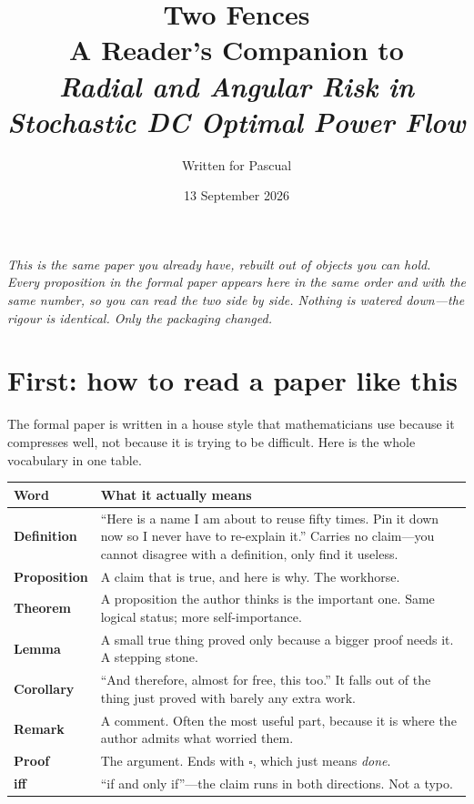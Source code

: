 \documentclass[11pt,a4paper]{article}
\title{\bfseries Two Fences\\[0.3em]
\large A Reader's Companion to\\
\emph{Radial and Angular Risk in Stochastic DC Optimal Power Flow}}
\author{Written for Pascual}
\date{13 September 2026}
\begin{document}
\maketitle

\begin{center}
\begin{minipage}{0.86\textwidth}
\small\itshape
This is the same paper you already have, rebuilt out of objects you can hold.
Every proposition in the formal paper appears here in the same order and with
the same number, so you can read the two side by side. Nothing is watered
down---the rigour is identical. Only the packaging changed.
\end{minipage}
\end{center}

\vspace{1em}
\tableofcontents
\newpage

\section{First: how to read a paper like this}

The formal paper is written in a house style that mathematicians use because it
compresses well, not because it is trying to be difficult. Here is the whole
vocabulary in one table.

\begin{center}
\small
\begin{tabular}{@{}p{}p{}@{}}
\toprule
\textbf{Word} & \textbf{What it actually means} \\
\midrule
\textbf{Definition} & ``Here is a name I am about to reuse fifty times. Pin it down now so I never have to re-explain it.'' Carries no claim---you cannot disagree with a definition, only find it useless. \\[0.4em]
\textbf{Proposition} & A claim that is true, and here is why. The workhorse. \\[0.4em]
\textbf{Theorem} & A proposition the author thinks is the important one. Same logical status; more self-importance. \\[0.4em]
\textbf{Lemma} & A small true thing proved only because a bigger proof needs it. A stepping stone. \\[0.4em]
\textbf{Corollary} & ``And therefore, almost for free, this too.'' It falls out of the thing just proved with barely any extra work. \\[0.4em]
\textbf{Remark} & A comment. Often the most useful part, because it is where the author admits what worried them. \\[0.4em]
\textbf{Proof} & The argument. Ends with $\square$, which just means \emph{done}. \\[0.4em]
\textbf{iff} & ``if and only if''---the claim runs in both directions. Not a typo. \\
\bottomrule
\end{tabular}
\end{center}
\end{document}
